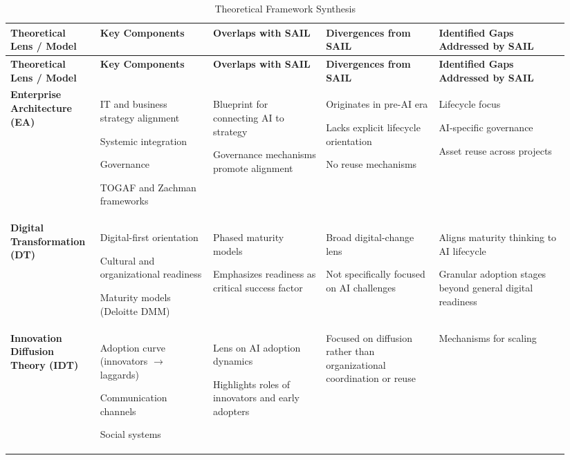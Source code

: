 \documentclass[]{imc-inf}
\begin{document}
\begin{footnotesize}
\begin{longtable}{|p{0.15\linewidth}|p{0.19\linewidth}|p{0.19\linewidth}|p{0.19\linewidth}|p{0.22\linewidth}|}
	\hline
	\textbf{Theoretical Lens / Model} &
	\textbf{Key Components} &
	\textbf{Overlaps with SAIL} &
	\textbf{Divergences from SAIL} &
	\textbf{Identified Gaps Addressed by SAIL} \\
	\hline
	\endfirsthead
	\hline
	\textbf{Theoretical Lens / Model} &
	\textbf{Key Components} &
	\textbf{Overlaps with SAIL} &
	\textbf{Divergences from SAIL} &
	\textbf{Identified Gaps Addressed by SAIL} \\
	\hline
	\endhead
	\hline
	\caption{Theoretical Framework Synthesis}
	\label{tab:theoretical_synthesis}
	\endlastfoot


\textbf{Enterprise Architecture (EA)} &
IT and business strategy alignment

Systemic integration

Governance

TOGAF and Zachman frameworks &
Blueprint for connecting AI to strategy

Governance mechanisms promote alignment &
Originates in pre-AI era

Lacks explicit lifecycle orientation

No reuse mechanisms &
Lifecycle focus

AI-specific governance

Asset reuse across projects \\
\hline

\textbf{Digital Transformation (DT)} &
Digital-first orientation

Cultural and organizational readiness

Maturity models (Deloitte DMM) &
Phased maturity models

Emphasizes readiness as critical success factor &
Broad digital-change lens

Not specifically focused on AI challenges &
Aligns maturity thinking to AI lifecycle

Granular adoption stages beyond general digital readiness \\
\hline

\textbf{Innovation Diffusion Theory (IDT)} &
Adoption curve (innovators $\rightarrow$ laggards)

Communication channels

Social systems &
Lens on AI adoption dynamics

Highlights roles of innovators and early adopters &
Focused on diffusion rather than organizational coordination or reuse &
Mechanisms for scaling


\end{longtable}
\end{footnotesize}
\end{document}
